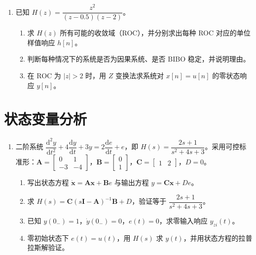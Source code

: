 \documentclass[11pt,a4paper]{ctexart}
\newcommand{\dd}{\mathrm{d}}
\begin{document}
\begin{enumerate}[label=\textbf{题\arabic*.},leftmargin=*,itemsep=1.2em,start=16]
\item \label{q:20}
已知 $H(z)=\dfrac{z^2}{(z-0.5)(z-2)}$。
\begin{enumerate}[label=(\alph*)]
    \item 求 $H(z)$ 所有可能的收敛域（ROC），并分别求出每种 ROC 对应的单位样值响应 $h[n]$。
    \item 判断每种情况下的系统是否为因果系统、是否 BIBO 稳定，并说明理由。
    \item 在 ROC 为 $|z|>2$ 时，用 $Z$ 变换法求系统对 $x[n]=u[n]$ 的零状态响应 $y[n]$。
\end{enumerate}

\end{enumerate}

\section{状态变量分析}

\begin{enumerate}[label=\textbf{题\arabic*.},leftmargin=*,itemsep=1.2em,start=21]

\item \label{q:21}
二阶系统 $\dfrac{\dd^2 y}{\dd t^2}+4\dfrac{\dd y}{\dd t}+3y=2\dfrac{\dd e}{\dd t}+e$，即 $H(s)=\dfrac{2s+1}{s^2+4s+3}$。采用可控标准形：$\mathbf{A}=\begin{bmatrix}0&1\\-3&-4\end{bmatrix}$，$\mathbf{B}=\begin{bmatrix}0\\1\end{bmatrix}$，$\mathbf{C}=\begin{bmatrix}1&2\end{bmatrix}$，$D=0$。
\begin{enumerate}[label=(\alph*)]
    \item 写出状态方程 $\dot{\mathbf{x}}=\mathbf{A}\mathbf{x}+\mathbf{B}e$ 与输出方程 $y=\mathbf{C}\mathbf{x}+De$。
    \item 求 $H(s)=\mathbf{C}(s\mathbf{I}-\mathbf{A})^{-1}\mathbf{B}+D$，验证等于 $\dfrac{2s+1}{s^2+4s+3}$。
    \item 已知 $y(0_-)=1$，$\dot{y}(0_-)=0$，$e(t)=0$，求零输入响应 $y_{zi}(t)$。
    \item 零初始状态下 $e(t)=u(t)$，用 $H(s)$ 求 $y(t)$，并用状态方程的拉普拉斯解验证。
\end{enumerate}

\end{enumerate}
\end{document}
